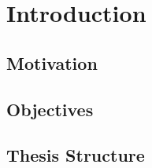 \chapter{Introduction}
\label{chapter:introduction}

\section{Motivation}
\section{Objectives}
\section{Thesis Structure}
